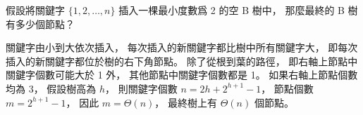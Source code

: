 \startEXERCISE
假設將關鍵字 $\{1,2,\ldots,n\}$ 插入一棵最小度數爲 2 的空 B 樹中，
那麼最終的 B 樹有多少個節點？
\stopEXERCISE

\startANSWER

\startcombination[nx=5,ny=1,location=top]
{\externalfigure[output/e18_2-4-1]}{}
{\externalfigure[output/e18_2-4-2]}{}
{\externalfigure[output/e18_2-4-3]}{}
{\externalfigure[output/e18_2-4-4]}{}
{\externalfigure[output/e18_2-4-5]}{}
\stopcombination

\startcombination[nx=3,ny=2,location=top]
{\externalfigure[output/e18_2-4-6]}{}
{\externalfigure[output/e18_2-4-7]}{}
{\externalfigure[output/e18_2-4-8]}{}
{\externalfigure[output/e18_2-4-9]}{}
{\externalfigure[output/e18_2-4-10]}{}
{\externalfigure[output/e18_2-4-11]}{}
\stopcombination

關鍵字由小到大依次插入，
每次插入的新關鍵字都比樹中所有關鍵字大，
即每次插入的新關鍵字都位於樹的右下角節點。
除了從根到葉的路徑，
即右軸上節點中關鍵字個數可能大於 1 外，
其他節點中關鍵字個數都是 1。
如果右軸上節點個數均為 3，
假設樹高為 $h$，
則關鍵字個數 $n=2h+2^{h+1}-1$，
節點個數 $m=2^{h+1}-1$，
因此 $m=\Theta(n)$，
最終樹上有 $\Theta(n)$ 個節點。
\stopANSWER
